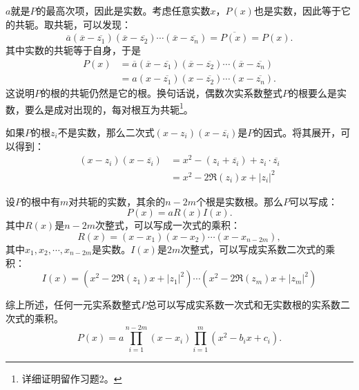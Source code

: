 \documentclass[12pt,UTF8]{ctexbook}
\theoremstyle{definition}
\theoremstyle{plain}
\begin{document}
\begin{appendix}
$a$就是$P$的最高次项，因此是实数。考虑任意实数$x$，$P(x)$也是实数，因此等于它的共轭。取共轭，可以发现：
$$ \overline{a}(\overline{x} - \overline{z_1})(\overline{x} - \overline{z_2})\cdots(\overline{x} - \overline{z_n}) = \overline{P(x)} = P(x).$$
其中实数的共轭等于自身，于是
\begin{align*}
    P(x) &= \overline{a}(\overline{x} - \overline{z_1})(\overline{x} - \overline{z_2})\cdots(\overline{x} - \overline{z_n}) \\
    &= a(x - \overline{z_1})(x - \overline{z_2})\cdots(x - \overline{z_n}). 
\end{align*}
这说明$P$的根的共轭仍然是它的根。换句话说，偶数次实系数整式$P$的根要么是实数，要么是成对出现的，每对根互为共轭\footnote{详细证明留作习题2。}。
  
如果$P$的根$z_i$不是实数，那么二次式$(x - z_i)(x - \overline{z_i})$是$P$的因式。将其展开，可以得到：
\begin{align*}
    (x - z_i)(x - \overline{z_i}) &= x^2 - (z_i + \overline{z_i}) + z_i\cdot\overline{z_i} \\
    &= x^2 - 2\Re(z_i)x + |z_i|^2
\end{align*}

设$P$的根中有$m$对共轭的实数，其余的$n-2m$个根是实数根。那么$P$可以写成：
$$ P(x) = aR(x)I(x).$$
其中$R(x)$是$n-2m$次整式，可以写成一次式的乘积：
$$ R(x) = (x - x_1)(x - x_2)\cdots(x - x_{n-2m}), $$
其中$x_1, x_2, \cdots, x_{n-2m}$是实数。$I(x)$是$2m$次整式，可以写成实系数二次式的乘积：
$$ I(x) = (x^2 - 2\Re(z_1)x + |z_1|^2) \cdots (x^2 - 2\Re(z_m)x + |z_m|^2)$$

综上所述，任何一元实系数整式$P$总可以写成实系数一次式和无实数根的实系数二次式的乘积。
$$ P(x) = a\prod_{i=1}^{n-2m}(x - x_i) \prod_{i=1}^m (x^2 - b_ix + c_i). $$


\end{appendix}
\end{document}
